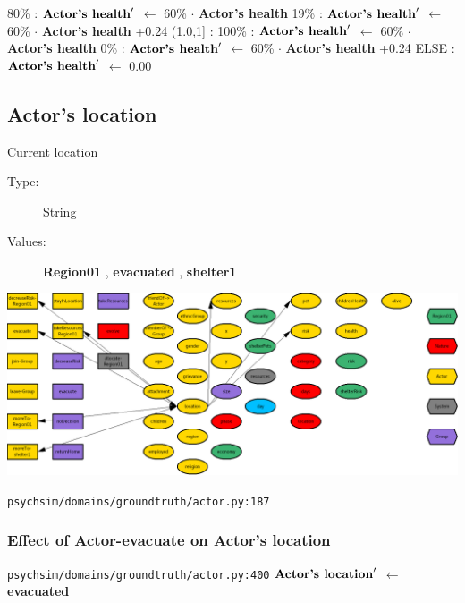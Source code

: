 \documentclass{article}%
\begin{document}
\begin{flushleft}
\hspace*{6em}%
80\%%
: %
$\mbox{\textbf{Actor's health}} '$%
$\leftarrow$%
60\%%
$\cdot$%
\textbf{Actor's health}%
\linebreak%
\hspace*{6em}%
19\%%
: %
$\mbox{\textbf{Actor's health}} '$%
$\leftarrow$%
60\%%
$\cdot$%
\textbf{Actor's health}%
+0.24%
\linebreak%
\hspace*{4em}%
(1.0,1{]}%
: %
\linebreak%
\hspace*{6em}%
100\%%
: %
$\mbox{\textbf{Actor's health}} '$%
$\leftarrow$%
60\%%
$\cdot$%
\textbf{Actor's health}%
\linebreak%
\hspace*{6em}%
0\%%
: %
$\mbox{\textbf{Actor's health}} '$%
$\leftarrow$%
60\%%
$\cdot$%
\textbf{Actor's health}%
+0.24%
\linebreak%
\hspace*{2em}%
ELSE %
: %
$\mbox{\textbf{Actor's health}} '$%
$\leftarrow$%
0.00%
\end{flushleft}

%
\subsection{Actor's location}%
\label{subsec:Actor's location}%
Current location%
\begin{description}%
\item[Type:]%
String%
\item[Values:]%
\textbf{Region01}%
, %
\textbf{evacuated}%
, %
\textbf{shelter1}%
\end{description}%
\includegraphics[width=\textwidth]{images/locationOfActor.png}%
\begin{flushleft}%
\verb|psychsim/domains/groundtruth/actor.py:187|%
\end{flushleft}%
\subsubsection{Effect of Actor{-}evacuate on Actor's location}%
\label{ssubsec:Effect of Actor{-}evacuate on Actor's location}%
\begin{flushleft}%
\verb|psychsim/domains/groundtruth/actor.py:400|%
\linebreak%
$\mbox{\textbf{Actor's location}} '$%
$\leftarrow$%
\textbf{evacuated}%
\end{flushleft}
\end{document}
